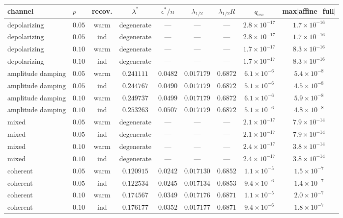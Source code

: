 \documentclass[10pt,a4paper]{article}
\begin{document}
\begin{longtable}{llccccccc}
\toprule channel & $p$ & recov. & $\lambda^*$ & $\epsilon^*/n$ & $\lambda_{1/2}$ & $\lambda_{1/2}R$ & $q_\mathrm{esc}$ & max$\lvert$affine$-$full$\rvert$ \\ \midrule
depolarizing & $0.05$ & warm & degenerate & --- & --- & --- & $2.8\times 10^{-17}$ & $1.7\times 10^{-16}$ \\
depolarizing & $0.05$ & ind & degenerate & --- & --- & --- & $2.8\times 10^{-17}$ & $1.7\times 10^{-16}$ \\
depolarizing & $0.10$ & warm & degenerate & --- & --- & --- & $1.7\times 10^{-17}$ & $8.3\times 10^{-16}$ \\
depolarizing & $0.10$ & ind & degenerate & --- & --- & --- & $1.7\times 10^{-17}$ & $8.3\times 10^{-16}$ \\
amplitude damping & $0.05$ & warm & $0.241111$ & $0.0482$ & $0.017179$ & $0.6872$ & $6.1\times 10^{-6}$ & $5.4\times 10^{-8}$ \\
amplitude damping & $0.05$ & ind & $0.244767$ & $0.0490$ & $0.017179$ & $0.6872$ & $5.1\times 10^{-6}$ & $4.5\times 10^{-8}$ \\
amplitude damping & $0.10$ & warm & $0.249737$ & $0.0499$ & $0.017179$ & $0.6872$ & $6.1\times 10^{-6}$ & $5.9\times 10^{-8}$ \\
amplitude damping & $0.10$ & ind & $0.253263$ & $0.0507$ & $0.017179$ & $0.6872$ & $5.1\times 10^{-6}$ & $4.8\times 10^{-8}$ \\
mixed & $0.05$ & warm & degenerate & --- & --- & --- & $2.1\times 10^{-17}$ & $7.9\times 10^{-14}$ \\
mixed & $0.05$ & ind & degenerate & --- & --- & --- & $2.1\times 10^{-17}$ & $7.9\times 10^{-14}$ \\
mixed & $0.10$ & warm & degenerate & --- & --- & --- & $2.4\times 10^{-17}$ & $3.8\times 10^{-14}$ \\
mixed & $0.10$ & ind & degenerate & --- & --- & --- & $2.4\times 10^{-17}$ & $3.8\times 10^{-14}$ \\
coherent & $0.05$ & warm & $0.120915$ & $0.0242$ & $0.017130$ & $0.6852$ & $1.1\times 10^{-5}$ & $1.5\times 10^{-7}$ \\
coherent & $0.05$ & ind & $0.122534$ & $0.0245$ & $0.017134$ & $0.6853$ & $9.4\times 10^{-6}$ & $1.4\times 10^{-7}$ \\
coherent & $0.10$ & warm & $0.174567$ & $0.0349$ & $0.017176$ & $0.6871$ & $1.1\times 10^{-5}$ & $2.0\times 10^{-7}$ \\
coherent & $0.10$ & ind & $0.176177$ & $0.0352$ & $0.017177$ & $0.6871$ & $9.4\times 10^{-6}$ & $1.8\times 10^{-7}$ \\
\bottomrule\end{longtable}
\end{document}

